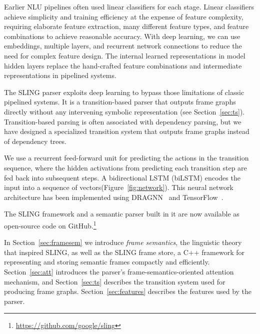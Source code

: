 \documentclass[11pt,a4paper]{article}
\begin{document}
Earlier NLU pipelines often used linear classifiers for each stage.
Linear classifiers achieve simplicity and training efficiency at the expense of
feature complexity, requiring elaborate feature
extraction, many different feature types, and
feature combinations to achieve reasonable accuracy.
With deep learning, we can use embeddings, multiple layers, and recurrent
network connections to reduce the need for complex
feature design. The internal learned representations in model hidden layers
replace the hand-crafted feature combinations and intermediate representations
in pipelined systems.


The SLING parser exploits deep learning to bypass those limitations of classic
pipelined systems.
It is a transition-based parser that outputs frame graphs directly without any
intervening symbolic representation (see Section~\ref{sec:ts}). Transition-based
parsing is often associated with dependency parsing, but we have designed a
specialized transition system that outputs frame graphs instead of dependency
trees.

We use a recurrent feed-forward unit for predicting the actions in the
transition sequence, where the hidden activations from predicting each
transition step are fed back into subsequent steps.
A bidirectional LSTM (biLSTM) encodes the input into a sequence of vectors(Figure~\ref{fig:network}).
This neural network architecture has been implemented using DRAGNN~\cite{dragnn}
and TensorFlow~\cite{tensorflow}.

The SLING framework and a semantic parser built in it are now available as
open-source code on GitHub.\footnote{\url{https://github.com/google/sling}}

In Section~\ref{sec:framesem} we introduce \emph{frame semantics}, the
linguistic theory that inspired SLING, as well as the SLING frame store, a
C++ framework for representing and storing semantic frames compactly and
efficiently.
Section~\ref{sec:att} introduces the parser's frame-semantics-oriented attention
mechanism, and Section~\ref{sec:ts} describes the transition system used for
producing frame graphs. Section~\ref{sec:features} describes the features used
by the parser.
\end{document}
